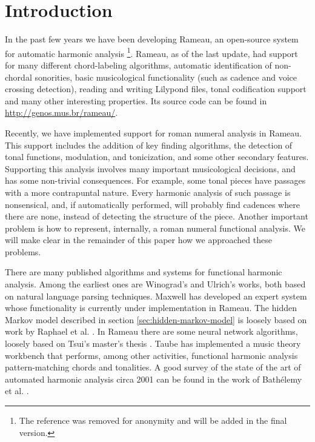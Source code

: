 
\section{Introduction}
\label{sec:introduction}

In the past few years we have been developing Rameau, an open-source
system for automatic harmonic analysis \footnote{The reference was
  removed for anonymity and will be added in the final
  version.}. Rameau, as of the last update, had support for many
different chord-labeling algorithms, automatic identification of
non-chordal sonorities, basic musicological functionality (such as
cadence and voice crossing detection), reading and writing Lilypond
\cite{nienhuys.ea08:lilypond} files, tonal codification support and
many other interesting properties. Its source code can be found in
\url{http://genos.mus.br/rameau/}.

Recently, we have implemented support for roman numeral analysis in
Rameau. This support includes the addition of key finding algorithms,
the detection of tonal functions, modulation, and tonicization, and
some other secondary features. Supporting this analysis involves many
important musicological decisions, and has some non-trivial
consequences. For example, some tonal pieces have passages with a more
contrapuntal nature. Every harmonic analysis of such passage is
nonsensical, and, if automatically performed, will probably find
cadences where there are none, instead of detecting the structure of
the piece.  Another important problem is how to represent, internally,
a roman numeral functional analysis. We will make clear in the
remainder of this paper how we approached these problems.

There are many published algorithms and systems for functional
harmonic analysis. Among the earliest ones are Winograd's
\cite{winograd68:linguistics} and Ulrich's \cite{ulrich77:analysis}
works, both based on natural language parsing techniques. Maxwell
\cite{maxwell92:expert} has developed an expert system whose
functionality is currently under implementation in Rameau. The hidden
Markov model described in section \ref{sec:hidden-markov-model} is
loosely based on work by Raphael et
al. \cite{raphael.ea03:harmonic}. In Rameau there are some neural
network algorithms, loosely based on Tsui's master's thesis
\cite{tsui02:harmonic}. Taube \cite{taube99:automatic} has implemented
a music theory workbench that performs, among other activities,
functional harmonic analysis pattern-matching chords and tonalities. A
good survey of the state of the art of automated harmonic analysis
circa 2001 can be found in the work of Bathélemy et
al. \cite{barthelemy.ea01:figured}.

